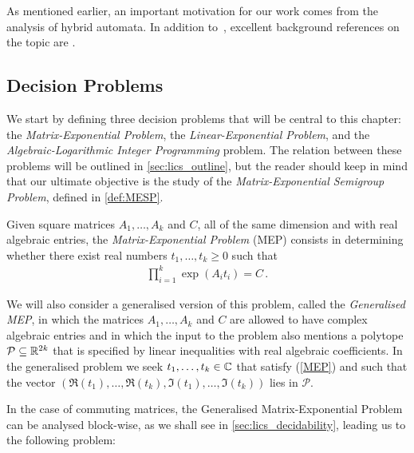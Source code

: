 As mentioned earlier, an important motivation for our work comes from
the analysis of hybrid automata. In addition to~\cite{Alu15},
excellent background references on the topic are
\cite{HenzingerSTOC,HenzingerLICS}.

\subsection{Decision Problems}

We start by defining three decision problems that will be central to this chapter: the \emph{Matrix-Exponential Problem},
the \emph{Linear-Exponential Problem}, and the
\emph{Algebraic-Logarithmic Integer Programming} problem.
The relation between these problems will be outlined in \cref{sec:lics_outline}, but the reader should keep in mind that our ultimate objective is the study of the \emph{Matrix-Exponential Semigroup Problem}, defined in \cref{def:MESP}.

\begin{definition}
  Given square matrices $A_{1}, \ldots, A_{k}$ and $C$, all of the same
  dimension and with real algebraic entries,
  the \emph{Matrix-Exponential Problem} (MEP) consists in determining
  whether there exist real numbers $t_1,\ldots,t_k \geq 0$ such that
\begin{align}
\label{MEP}
\prod \limits_{i=1}^{k} \exp(A_{i} t_{i}) = C \, .
\end{align}
\label{def:MEP}
\end{definition}

We will also consider a generalised version of this problem, called
the \emph{Generalised MEP}, in which the matrices $A_1,\ldots,A_k$ and
$C$ are allowed to have complex algebraic entries and in which the
input to the problem also mentions a polytope
$\mathcal{P}\subseteq\mathbb{R}^{2k}$ that is specified by linear
inequalities with real algebraic coefficients.  In the generalised problem
we seek $t_1,\ldots,t_k \in \mathbb{C}$ that satisfy (\ref{MEP}) and
such that the vector
$(\Re(t_1),\ldots,\Re(t_k),
\Im(t_1),\ldots,\Im(t_k))$ lies in $\mathcal{P}$.

In the case of commuting matrices, the Generalised Matrix-Exponential
Problem can be analysed block-wise, as we shall see in \cref{sec:lics_decidability}, leading us to the following
problem:

